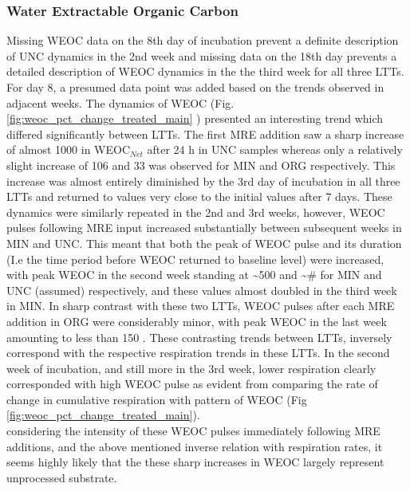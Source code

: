 		\subsubsection{Water Extractable Organic Carbon}

			Missing WEOC data on the 8th day of incubation prevent a definite description of UNC dynamics in the 2nd week and missing data on the 18th day prevents a detailed description of WEOC dynamics in the the third week for all three LTTs. For day 8, a presumed data point was added based on the trends observed in adjacent weeks.
			The dynamics of WEOC (Fig. \ref{fig:weoc_pct_change_treated_main} ) presented an interesting trend which differed significantly between LTTs. The first MRE addition saw a sharp increase of almost 1000 \genericunit in WEOC$_{Net}$ after 24 h in UNC samples whereas only a relatively slight increase of 106 and 33 \genericunit was observed for MIN and ORG respectively. This increase was almost entirely diminished by the 3rd day of incubation in all three LTTs and returned to values very close to the initial values after 7 days. These dynamics were similarly repeated in the 2nd and 3rd weeks, however, WEOC pulses following MRE input increased substantially between subsequent weeks in MIN and UNC. This meant that both the peak of WEOC pulse and its duration (I.e the time period before WEOC returned to baseline level) were increased, with peak WEOC in the second week standing at \~{}500 and \~{}\# \genericunit for MIN and UNC (assumed) respectively, and these values almost doubled in the third week in MIN. In sharp contrast with these two LTTs, WEOC pulses after each MRE addition in ORG were considerably minor, with peak WEOC in the last week amounting to less than 150 \genericunit.
			These contrasting trends between LTTs, inversely correspond with the respective respiration trends in these LTTs. In the second week of incubation, and still more in the 3rd week, lower respiration clearly corresponded with high WEOC pulse as evident from comparing the rate of change in cumulative respiration with pattern of WEOC (Fig \ref{fig:weoc_pct_change_treated_main}).\\
			considering the intensity of these WEOC pulses immediately following MRE additions, and the above mentioned inverse relation with respiration rates, it seems highly likely that the these sharp increases in WEOC largely represent unprocessed substrate.
